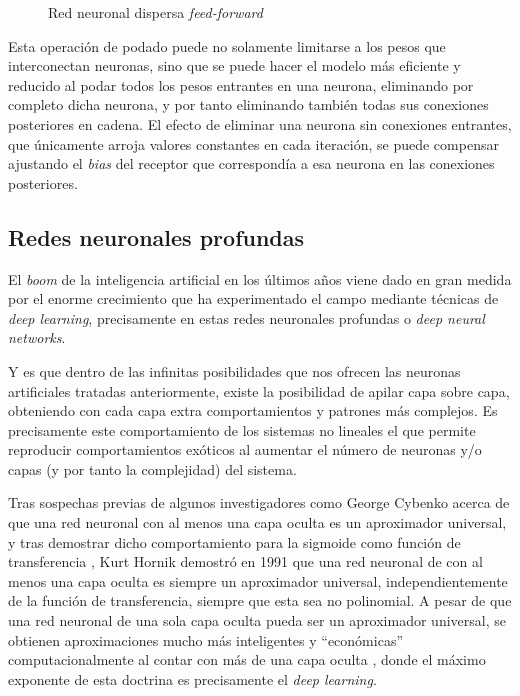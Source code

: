 \begin{figure}[h!]
    \centering
    \vspace*{0.5cm}
    \def\svgwidth{0.85\textwidth}
    
    \caption{Red neuronal dispersa \textit{feed-forward}}
    \label{fig:sparse_nn_sample}
\end{figure}

Esta operación de podado puede no solamente limitarse a los pesos que interconectan neuronas, sino que se puede hacer el modelo más eficiente y reducido al podar todos los pesos entrantes en una neurona, eliminando por completo dicha neurona, y por tanto eliminando también todas sus conexiones posteriores en cadena. El efecto de eliminar una neurona sin conexiones entrantes, que únicamente arroja valores constantes en cada iteración, se puede compensar ajustando el \textit{bias} del receptor que correspondía a esa neurona en las conexiones posteriores.

\subsection{Redes neuronales profundas}
\label{ssec:redes_reuronales_profundas}
El \textit{boom} de la inteligencia artificial en los últimos años viene dado en gran medida por el enorme crecimiento que ha experimentado el campo mediante técnicas de \textit{deep learning}, precisamente en estas redes neuronales profundas o \textit{deep neural networks}.

Y es que dentro de las infinitas posibilidades que nos ofrecen las neuronas artificiales tratadas anteriormente, existe la posibilidad de apilar capa sobre capa, obteniendo con cada capa extra comportamientos y patrones más complejos.
Es precisamente este comportamiento de los sistemas no lineales el que permite reproducir comportamientos exóticos al aumentar el número de neuronas y/o capas (y por tanto la complejidad) del sistema.

Tras sospechas previas de algunos investigadores como George Cybenko acerca de que una red neuronal con al menos una capa oculta es un aproximador universal, y tras demostrar dicho comportamiento para la sigmoide como función de transferencia \cite{cybenko1989approximation}, Kurt Hornik demostró en 1991 que una red neuronal de con al menos una capa oculta es siempre un aproximador universal, independientemente de la función de transferencia, siempre que esta sea no polinomial. A pesar de que una red neuronal de una sola capa oculta pueda ser un aproximador universal, se obtienen aproximaciones mucho más inteligentes y ``económicas'' computacionalmente al contar con más de una capa oculta \cite{hornik1991approximation}, donde el máximo exponente de esta doctrina es precisamente el \textit{deep learning}.

